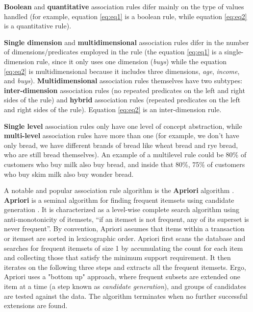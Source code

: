 \textbf{Boolean} and \textbf{quantitative} association rules difer mainly on the type of values handled (for example, equation \ref{eq:eq1} is a boolean rule, while equation \ref{eq:eq2} is a quantitative rule). 

\textbf{Single dimension} and \textbf{multidimensional} association rules difer in the number of dimensions/predicates employed in the rule (the equation \ref{eq:eq1} is a single-dimension rule, since it only uses one dimension (\textit{buys}) while the equation \ref{eq:eq2} is multidimensional because it includes three dimensions, \textit{age}, \textit{income}, and \textit{buys}). \textbf{Multidimensional} association rules themselves have two subtypes: \textbf{inter-dimension} association rules (no repeated predicates on the left and right sides of the rule) and \textbf{hybrid} association rules (repeated predicates on the left and right sides of the rule). Equation \ref{eq:eq2} is an inter-dimension rule. 

\textbf{Single level} association rules only have one level of concept abstraction, while \textbf{multi-level} association rules have more than one (for example, we don't have only bread, we have different brands of bread like wheat bread and rye bread, who are still bread themselves). An example of a multilevel rule could be 80\% of customers who buy milk also buy bread, and inside that 80\%, 75\% of customers who buy skim milk also buy wonder bread. 

A notable and popular association rule algorithm is the \textbf{Apriori} algorithm \cite{wu2008top}. \textbf{Apriori} \cite{agrawal1994fast} is a seminal algorithm for finding frequent itemsets using candidate generation \cite{agrawal1994fast}. It is characterized as a level-wise complete search algorithm using anti-monotonicity of itemsets, “if an itemset is not frequent, any of its superset is never frequent”. By convention, Apriori assumes that items within a transaction or itemset are sorted in lexicographic order. Apriori first scans the database and searches for frequent itemsets of size 1 by accumulating the count for each item and collecting those that satisfy the minimum support requirement. It then iterates on the following three steps and extracts all the frequent itemsets. Ergo, Apriori uses a "bottom up" approach, where frequent subsets are extended one item at a time (a step known as \textit{candidate generation}), and groups of candidates are tested against the data. The algorithm terminates when no further successful extensions are found.

